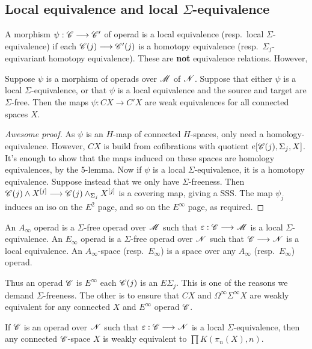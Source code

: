 \documentclass[11pt]{article}
\begin{document}
\begin{chapter1-3}
\subsection{Local equivalence and local \texorpdfstring{$\Sigma$}{Sigma}-equivalence}
A morphism $\psi:\mathscr{C}\longrightarrow\mathscr{C}'$ of operad is a local equivalence (resp.\ local $\Sigma$-equivalence)  if
each $\mathscr{C}(j)\longrightarrow\mathscr{C}'(j)$ is a homotopy equivalence (resp.\ $\Sigma_j$-equivariant homotopy equivalence).
These are \textbf{not} equivalence relations. However,
\begin{prop*}[3.4]
Suppose $\psi$ is a morphism of operads over $\mathscr{M}$ of $\mathscr{N}$. Suppose that
either $\psi$ is a local $\Sigma$-equivalence, or that $\psi$ is a local
equivalence and the source and target are $\Sigma$-free. Then the maps
$\psi:CX\to C'X$ are weak equivalences for all connected spaces $X$.
\end{prop*}
\begin{proof}[Awesome proof]
As $\psi$ is an $H$-map of connected $H$-spaces, only need a homology-equivalence.
However, $CX$ is build from cofibrations with quotient $e[\mathscr{C}(j),\Sigma_j,X]$.
It's enough to show that the maps induced on these spaces are homology
equivalences, by the 5-lemma. Now if $\psi$ is a local $\Sigma$-equivalence, 
it is a homotopy equivalence. Suppose instead that we only have $\Sigma$-freeness.
Then $\mathscr{C}(j)\wedge X^{[j]}\longrightarrow\mathscr{C}(j)\wedge_{\Sigma_j} X^{[j]}$ is a covering
map, giving a SSS. The map $\psi_j$ induces an iso on the $E^2$ page, and so
on the $E^\infty$ page, as required.
\end{proof}
\begin{defn*}[3.5]
An $A_\infty$ operad is a $\Sigma$-free operad over $\mathscr{M}$ such that
$\varepsilon:\mathscr{C}\longrightarrow\mathscr{M}$ is a local $\Sigma$-equivalence.
An $E_\infty$ operad is a $\Sigma$-free operad over $\mathscr{N}$ such that 
$\mathscr{C}\longrightarrow\mathscr{N}$ is a local equivalence.
 An $A_\infty$-space 
(resp.\ $E_\infty$) is a space over any $A_\infty$ (resp.\ $E_\infty$) operad.
\end{defn*}\noindent
Thus an operad $\mathscr{C}$ is $E^\infty$ \Iff each $\mathscr{C}(j)$ is an $E\Sigma_j$. 
This is one of the reasons we demand $\Sigma$-freeness. The other is to ensure
that $CX$ and $\Omega^\infty\Sigma^\infty X$ are weakly equivalent for any
connected $X$ and $E^\infty$ operad $\mathscr{C}$.
\begin{prop*}[3.6]
If $\mathscr{C}$ is an operad over $\mathscr{N}$ such that $\varepsilon:\mathscr{C}\longrightarrow\mathscr{N}$ is a local
$\Sigma$-equivalence, then any connected $\mathscr{C}$-space $X$ is weakly equivalent
to $\prod K(\pi_n(X),n)$.

\end{prop*}
\end{chapter1-3}
\end{document}
